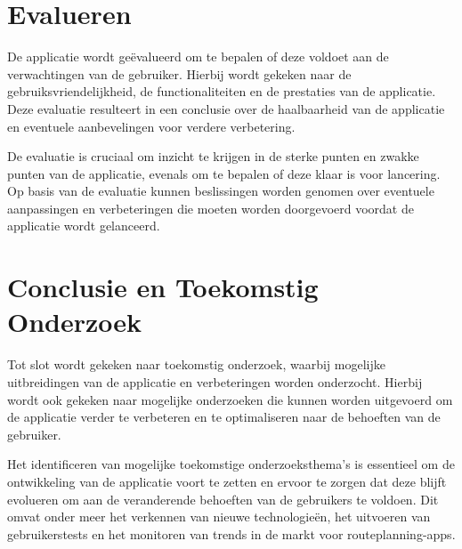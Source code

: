 \section{Evalueren}

De applicatie wordt geëvalueerd om te bepalen of deze voldoet aan de verwachtingen van de gebruiker. 
Hierbij wordt gekeken naar de gebruiksvriendelijkheid, de functionaliteiten en de prestaties van de applicatie. 
Deze evaluatie resulteert in een conclusie over de haalbaarheid van de applicatie en eventuele aanbevelingen voor verdere verbetering.

De evaluatie is cruciaal om inzicht te krijgen in de sterke punten en zwakke punten van de applicatie, evenals om te bepalen of deze klaar is voor lancering. 
Op basis van de evaluatie kunnen beslissingen worden genomen over eventuele aanpassingen en verbeteringen die moeten worden doorgevoerd voordat de applicatie wordt gelanceerd.

\section{Conclusie en Toekomstig Onderzoek}

Tot slot wordt gekeken naar toekomstig onderzoek, waarbij mogelijke uitbreidingen van de applicatie en verbeteringen worden onderzocht. 
Hierbij wordt ook gekeken naar mogelijke onderzoeken die kunnen worden uitgevoerd om de applicatie verder te verbeteren en te optimaliseren naar de behoeften van de gebruiker.

Het identificeren van mogelijke toekomstige onderzoeksthema's is essentieel om de ontwikkeling van de applicatie voort te zetten 
en ervoor te zorgen dat deze blijft evolueren om aan de veranderende behoeften van de gebruikers te voldoen. Dit omvat onder meer het verkennen van nieuwe technologieën, 
het uitvoeren van gebruikerstests en het monitoren van trends in de markt voor routeplanning-apps.

